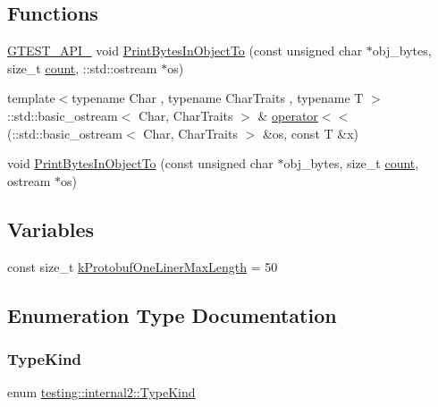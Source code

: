 \subsection*{Functions}
\begin{DoxyCompactItemize}
\item 
\hyperlink{gtest-port_8h_aa73be6f0ba4a7456180a94904ce17790}{G\+T\+E\+S\+T\+\_\+\+A\+P\+I\+\_\+} void \hyperlink{namespacetesting_1_1internal2_a9fbf8e07c0f94dc74d6ef5e56cd3c553}{Print\+Bytes\+In\+Object\+To} (const unsigned char $\ast$obj\+\_\+bytes, size\+\_\+t \hyperlink{gmock__stress__test_8cc_afd9db40e3361ae09188795e8cbe19752}{count}, \+::std\+::ostream $\ast$os)
\item 
{\footnotesize template$<$typename Char , typename Char\+Traits , typename T $>$ }\\\+::std\+::basic\+\_\+ostream$<$ Char, Char\+Traits $>$ \& \hyperlink{namespacetesting_1_1internal2_a07dbe129beb8952074f04b599dfce39b}{operator$<$$<$} (\+::std\+::basic\+\_\+ostream$<$ Char, Char\+Traits $>$ \&os, const T \&x)
\item 
void \hyperlink{namespacetesting_1_1internal2_abfb9aa80365f93b952e9a4bea09947a8}{Print\+Bytes\+In\+Object\+To} (const unsigned char $\ast$obj\+\_\+bytes, size\+\_\+t \hyperlink{gmock__stress__test_8cc_afd9db40e3361ae09188795e8cbe19752}{count}, ostream $\ast$os)
\end{DoxyCompactItemize}
\subsection*{Variables}
\begin{DoxyCompactItemize}
\item 
const size\+\_\+t \hyperlink{namespacetesting_1_1internal2_a140c8efd51e63a3def98445bff107518}{k\+Protobuf\+One\+Liner\+Max\+Length} = 50
\end{DoxyCompactItemize}


\subsection{Enumeration Type Documentation}
\mbox{\label{namespacetesting_1_1internal2_aeb8161b0b3ee503347b0662d7028fd57}} 
\subsubsection{\texorpdfstring{Type\+Kind}{TypeKind}}
{\footnotesize\ttfamily enum \hyperlink{namespacetesting_1_1internal2_aeb8161b0b3ee503347b0662d7028fd57}{testing\+::internal2\+::\+Type\+Kind}}

